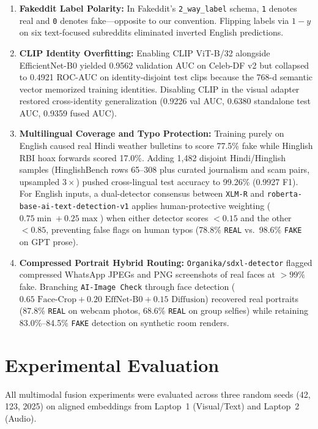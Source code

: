 \documentclass[conference]{IEEEtran}
\begin{document}
\begin{enumerate}
\item \textbf{Fakeddit Label Polarity:} In Fakeddit's \texttt{2\_way\_label} schema, \texttt{1} denotes real and \texttt{0} denotes fake—opposite to our convention. Flipping labels via $1 - y$ on six text-focused subreddits eliminated inverted English predictions.
\item \textbf{CLIP Identity Overfitting:} Enabling CLIP ViT-B/32 alongside EfficientNet-B0 yielded 0.9562 validation AUC on Celeb-DF v2 but collapsed to 0.4921 ROC-AUC on identity-disjoint test clips because the 768-d semantic vector memorized training identities. Disabling CLIP in the visual adapter restored cross-identity generalization (0.9226 val AUC, 0.6380 standalone test AUC, 0.9359 fused AUC).
\item \textbf{Multilingual Coverage and Typo Protection:} Training purely on English caused real Hindi weather bulletins to score 77.5\% fake while Hinglish RBI hoax forwards scored 17.0\%. Adding 1,482 disjoint Hindi/Hinglish samples (HinglishBench rows 65--308 plus curated journalism and scam pairs, upsampled $3\times$) pushed cross-lingual test accuracy to 99.26\% (0.9927 F1). For English inputs, a dual-detector consensus between \texttt{XLM-R} and \texttt{roberta-base-ai-text-detection-v1} applies human-protective weighting ($0.75\min + 0.25\max$) when either detector scores $<0.15$ and the other $<0.85$, preventing false flags on human typos (78.8\% \texttt{REAL} vs.\ 98.6\% \texttt{FAKE} on GPT prose).
\item \textbf{Compressed Portrait Hybrid Routing:} \texttt{Organika/sdxl-detector} flagged compressed WhatsApp JPEGs and PNG screenshots of real faces at $>99\%$ fake. Branching \texttt{AI-Image Check} through face detection ($0.65\text{ Face-Crop} + 0.20\text{ EffNet-B0} + 0.15\text{ Diffusion}$) recovered real portraits (87.8\% \texttt{REAL} on webcam photos, 68.6\% \texttt{REAL} on group selfies) while retaining 83.0\%--84.5\% \texttt{FAKE} detection on synthetic room renders.
\end{enumerate}

\section{Experimental Evaluation}
All multimodal fusion experiments were evaluated across three random seeds (42, 123, 2025) on aligned embeddings from Laptop~1 (Visual/Text) and Laptop~2 (Audio).
\end{document}
